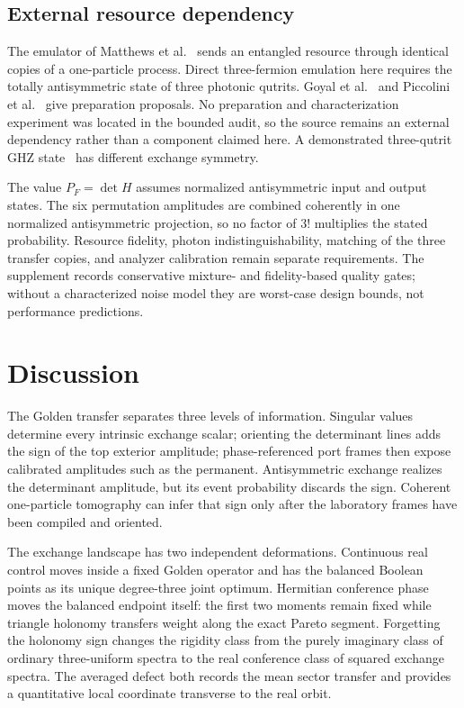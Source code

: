 \documentclass[11pt]{article}
\theoremstyle{remark}
\begin{document}
\subsection*{External resource dependency}

The emulator of Matthews et al.~\cite{Matthews} sends an entangled resource
through identical copies of a one-particle process.  Direct three-fermion
emulation here requires the totally antisymmetric state of three photonic
qutrits.  Goyal et al.~\cite{Goyal} and Piccolini et
al.~\cite{PiccoliniSinglet} give preparation proposals.  No preparation and
characterization experiment was located in the bounded audit, so the source
remains an external dependency rather than a component claimed here.  A
demonstrated three-qutrit GHZ state~\cite{Hu} has different exchange symmetry.

The value \(P_F=\det H\) assumes normalized antisymmetric input and output
states.  The six permutation amplitudes are combined coherently in one
normalized antisymmetric projection, so no factor of \(3!\) multiplies the
stated probability.  Resource fidelity, photon indistinguishability, matching
of the three transfer copies, and analyzer calibration remain separate
requirements.  The supplement records conservative mixture- and
fidelity-based quality gates; without a characterized noise model they are
worst-case design bounds, not performance predictions.

\section{Discussion}

The Golden transfer separates three levels of information.  Singular values
determine every intrinsic exchange scalar; orienting the determinant lines
adds the sign of the top exterior amplitude; phase-referenced port frames then
expose calibrated amplitudes such as the permanent.  Antisymmetric exchange
realizes the determinant amplitude, but its event probability discards the
sign.  Coherent one-particle tomography can infer that sign only after the
laboratory frames have been compiled and oriented.

The exchange landscape has two independent deformations.  Continuous real
control moves inside a fixed Golden operator and has the balanced Boolean
points as its unique degree-three joint optimum.  Hermitian conference phase
moves the balanced endpoint itself: the first two moments remain fixed while
triangle holonomy transfers weight along the exact Pareto segment.  Forgetting
the holonomy sign changes the rigidity class from the purely imaginary class
of ordinary three-uniform spectra to the real conference class of squared
exchange spectra.  The averaged defect both records the mean sector transfer
and provides a quantitative local coordinate transverse to the real orbit.
\end{document}
